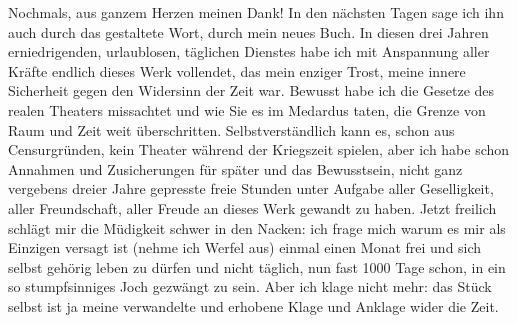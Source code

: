 \pstart
           Nochmals, aus ganzem Herzen meinen Dank! In den nächsten Tagen sage ich ihn auch
               durch das gestaltete Wort, durch mein neues Buch. In diesen drei Jahren erniedrigenden, urlaublosen,
               täglichen Dienstes habe ich mit Anspannung aller Kräfte endlich dieses {\pb}Werk vollendet, das mein enziger Trost, meine innere
               Sicherheit gegen den Widersinn der Zeit war. Bewusst habe ich die Gesetze des realen
               Theaters missachtet und wie Sie es im Medardus
               taten, die Grenze von Raum und Zeit weit überschritten. Selbstverständlich kann es,
               schon aus Censurgründen, kein Theater während der Kriegszeit spielen, aber ich habe
               schon Annahmen und Zusicherungen für später und das Bewusstsein, nicht ganz vergebens
               dreier Jahre gepresste freie Stunden unter Aufgabe aller Geselligkeit, aller
               Freundschaft, aller Freude an dieses Werk gewandt zu haben. Jetzt freilich schlägt
               mir die Müdigkeit schwer in den Nacken: ich frage mich warum es mir als Einzigen
               versagt ist (nehme ich Werfel aus) einmal
               einen Monat frei und sich selbst gehörig leben zu dürfen und nicht täglich, nun fast
               1000 Tage schon, in ein so stumpfsinniges Joch gezwängt zu sein. Aber ich klage nicht
               mehr: das Stück selbst ist ja
               meine verwandelte und erhobe{\pb}ne Klage und
               Anklage wider die Zeit.\pend
           
